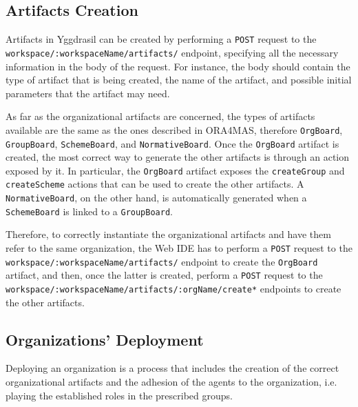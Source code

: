 \subsection{Artifacts Creation}
Artifacts in Yggdrasil can be created by performing a \texttt{POST} request to the \texttt{workspace/:workspaceName/artifacts/} endpoint, specifying all the necessary information in the body of the request.
For instance, the body should contain the type of artifact that is being created, the name of the artifact, and possible initial parameters that the artifact may need.

As far as the organizational artifacts are concerned, the types of artifacts available are the same as the ones described in \textsf{ORA4MAS}, therefore \texttt{OrgBoard}, \texttt{GroupBoard}, \texttt{SchemeBoard}, and \texttt{NormativeBoard}.
Once the \texttt{OrgBoard} artifact is created, the most correct way to generate the other artifacts is through an action exposed by it.
In particular, the \texttt{OrgBoard} artifact exposes the \texttt{createGroup} and \texttt{createScheme} actions that can be used to create the other artifacts.
A \texttt{NormativeBoard}, on the other hand, is automatically generated when a \texttt{SchemeBoard} is linked to a \texttt{GroupBoard}.

Therefore, to correctly instantiate the organizational artifacts and have them refer to the same organization, the Web IDE has to perform a \texttt{POST} request to the \texttt{workspace/:workspaceName/artifacts/} endpoint to create the \texttt{OrgBoard} artifact, and then, once the latter is created, perform a \texttt{POST} request to the \texttt{workspace/:workspaceName/artifacts/:orgName/create*} endpoints to create the other artifacts.

\subsection{Organizations' Deployment}
Deploying an organization is a process that includes the creation of the correct organizational artifacts and the adhesion of the agents to the organization, i.e. playing the established roles in the prescribed groups.

